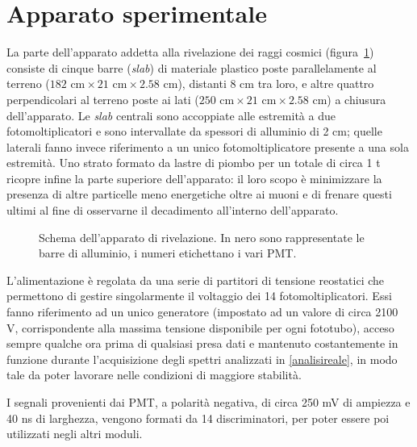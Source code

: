 \documentclass[10pt, oneside, a4paper]{article}   	%
\begin{document}
\section{Apparato sperimentale}
La parte dell'apparato addetta alla rivelazione dei raggi cosmici (figura~\ref{appScheme}) consiste di cinque barre (\emph{slab}) di materiale plastico poste parallelamente al terreno ($182 \text{ cm}\times21\text{ cm}\times2.58$ cm), distanti 8 cm tra loro, e altre quattro perpendicolari al terreno poste ai lati ($250\text{ cm}\times21\text{ cm}\times2.58$ cm) a chiusura dell'apparato. Le \emph{slab} centrali sono accoppiate alle estremità a due fotomoltiplicatori e sono intervallate da spessori di alluminio di 2 cm; quelle laterali fanno invece riferimento a un unico fotomoltiplicatore presente a una sola estremità. Uno strato formato da lastre di piombo per un totale di circa 1 t ricopre infine la parte superiore dell'apparato: il loro scopo è minimizzare la presenza di altre particelle meno energetiche oltre ai muoni e di frenare questi ultimi al fine di osservarne il decadimento all'interno dell'apparato.
%
\begin{figure}[h]
	\centering
		
	\caption{Schema dell'apparato di rivelazione. In nero sono rappresentate le barre di alluminio, i numeri etichettano i vari PMT.}
	\label{appScheme}
\end{figure}
%
L'alimentazione è regolata da una serie di partitori di tensione reostatici che permettono di gestire singolarmente il voltaggio dei 14 fotomoltiplicatori. Essi fanno riferimento ad un unico generatore (impostato ad un valore di circa 2100 V, corrispondente alla massima tensione disponibile per ogni fototubo), acceso sempre qualche ora prima di qualsiasi presa dati e mantenuto costantemente in funzione durante l'acquisizione degli spettri analizzati in \cref{analisireale}, in modo tale da poter lavorare nelle condizioni di maggiore stabilità.

I segnali provenienti dai PMT, a polarità negativa, di circa 250 mV di ampiezza e 40 ns di larghezza, vengono formati da 14 discriminatori, per poter essere poi utilizzati negli altri moduli.
%
%
\end{document}
